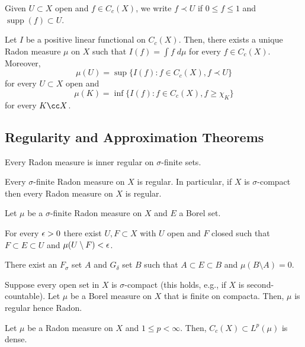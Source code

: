 \documentclass[11pt]{article}
\DeclareMathOperator{\supp}{supp} %
\begin{document}
Given $U\subset X$ open and $f\in C_c(X)$, we write $f\prec U$ if $0\leq f\leq1$ and $\supp(f)\subset U$.

\begin{theorem}
Let $I$ be a positive linear functional on $C_c(X)$. Then, there exists a unique Radon measure $\mu$ on $X$ such that $I(f)=\int f\;d\mu$ for every $f\in C_c(X)$. Moreover,
$$\mu(U)=\sup\{I(f) : f\in C_c(X),f\prec U\}$$
for every $U\subset X$ open and
$$\mu(K)=\inf\{I(f) : f\in C_c(X),f\geq\chi_K\}$$
for every $K\cc X$.
\end{theorem}

\subsection{Regularity and Approximation Theorems}
\begin{proposition}
Every Radon measure is inner regular on $\sigma$-finite sets.
\end{proposition}

\begin{corollary}
Every $\sigma$-finite Radon measure on $X$ is regular. In particular, if $X$ is $\sigma$-compact then every Radon measure on $X$ is regular.
\end{corollary}

\begin{proposition}
Let $\mu$ be a $\sigma$-finite Radon measure on $X$ and $E$ a Borel set.
\begin{enum}{\alph}
\item For every $\epsilon>0$ there exist $U,F\subset X$ with $U$ open and $F$ closed such that $F\subset E\subset U$ and $\mu(U\setminus F)<\epsilon$.

\item There exist an $F_{\sigma}$ set $A$ and $G_{\delta}$ set $B$ such that $A\subset E\subset B$ and $\mu(B\setminus A)=0$.
\end{enum}
\end{proposition}

\begin{theorem}
Suppose every open set in $X$ is $\sigma$-compact (this holds, e.g., if $X$ is second-countable). Let $\mu$ be a Borel measure on $X$ that is finite on compacta. Then, $\mu$ is regular hence Radon. 
\end{theorem}

\begin{proposition}
Let $\mu$ be a Radon measure on $X$ and $1\leq p<\infty$. Then, $C_c(X)\subset L^p(\mu)$ is dense.
\end{proposition}
\end{document}
